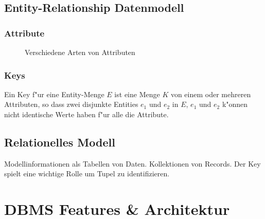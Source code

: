 \documentclass[german, 10pt, a4paper, twocolumn]{scrartcl}
\theoremstyle{definition}
\theoremstyle{remark}
\theoremstyle{example}
\begin{document}
\pagebreak
\subsection{Entity-Relationship Datenmodell}

\subsubsection{Attribute}

\begin{figure}[htb]
\begin{center}
\end{center}
\caption{Verschiedene Arten von Attributen}
\end{figure}

\subsubsection{Keys}

Ein Key f"ur eine Entity-Menge $E$ ist eine Menge $K$ von einem oder mehreren Attributen, so dass zwei disjunkte Entities $e_1$ und $e_2$ in $E$, $e_1$ und $e_2$ k"onnen nicht identische Werte haben f"ur alle die Attribute.

\subsection{Relationelles Modell}

Modellinformationen als Tabellen von Daten. Kollektionen von Records. Der Key spielt eine wichtige Rolle um Tupel zu identifizieren.


\section{DBMS Features \& Architektur}
\end{document}
